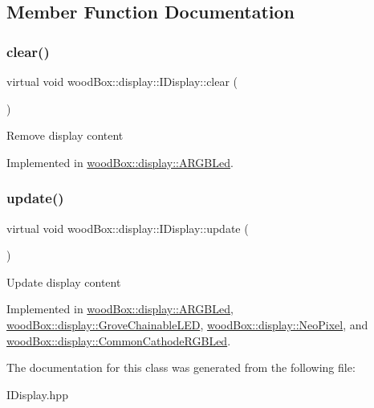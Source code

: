 \subsection{Member Function Documentation}
\mbox{\label{classwood_box_1_1display_1_1_i_display_a7030f0768c1ef15ce936a259406168dc}} 
\subsubsection{\texorpdfstring{clear()}{clear()}}
{\footnotesize\ttfamily virtual void wood\+Box\+::display\+::\+I\+Display\+::clear (\begin{DoxyParamCaption}{ }\end{DoxyParamCaption})\hspace{0.3cm}{\ttfamily [pure virtual]}}

Remove display content 

Implemented in \mbox{\hyperlink{classwood_box_1_1display_1_1_a_r_g_b_led_a6639eef02bb6b70988d85c006f73eb72}{wood\+Box\+::display\+::\+A\+R\+G\+B\+Led}}.

\mbox{\label{classwood_box_1_1display_1_1_i_display_ad8c0811b8b807ce119a06c7806004de7}} 
\subsubsection{\texorpdfstring{update()}{update()}}
{\footnotesize\ttfamily virtual void wood\+Box\+::display\+::\+I\+Display\+::update (\begin{DoxyParamCaption}{ }\end{DoxyParamCaption})\hspace{0.3cm}{\ttfamily [pure virtual]}}

Update display content 

Implemented in \mbox{\hyperlink{classwood_box_1_1display_1_1_a_r_g_b_led_ab71f321d91e931f95b96d1f492a9454d}{wood\+Box\+::display\+::\+A\+R\+G\+B\+Led}}, \mbox{\hyperlink{classwood_box_1_1display_1_1_grove_chainable_l_e_d_a650969665d0b5607465a63159c62e4ef}{wood\+Box\+::display\+::\+Grove\+Chainable\+L\+ED}}, \mbox{\hyperlink{classwood_box_1_1display_1_1_neo_pixel_ac2ec48825a10154e0ef99c4d8010aa6e}{wood\+Box\+::display\+::\+Neo\+Pixel}}, and \mbox{\hyperlink{classwood_box_1_1display_1_1_common_cathode_r_g_b_led_a597c7ae002c7f94431ccaafd160a857a}{wood\+Box\+::display\+::\+Common\+Cathode\+R\+G\+B\+Led}}.



The documentation for this class was generated from the following file\+:\begin{DoxyCompactItemize}
\item 
I\+Display.\+hpp\end{DoxyCompactItemize}
